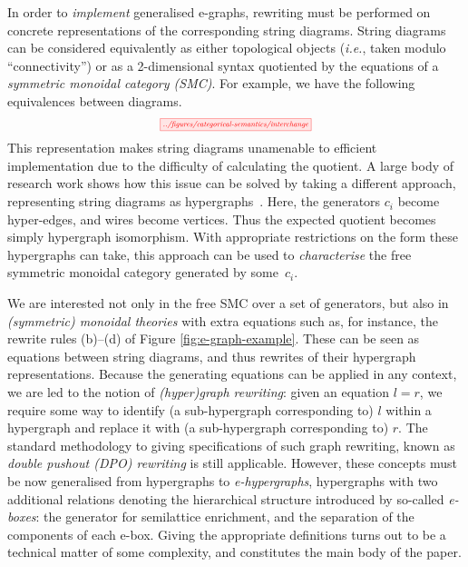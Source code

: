 In order to \textit{implement} generalised e-graphs, rewriting must be performed on concrete representations of the corresponding string diagrams.  String diagrams can be considered equivalently as either topological objects (\textit{i.e.}, taken modulo ``connectivity'') or as a 2-dimensional syntax quotiented by the equations of a \textit{symmetric monoidal category (SMC)}. 
For example, we have the following equivalences between diagrams. 
\[
	\scalebox{0.6}{
	\tikzfig{../figures/categorical-semantics/interchange}
	}
\]
This representation makes string diagrams unamenable to efficient implementation due to the difficulty of calculating the quotient. 
A large body of research work shows how this issue can be solved by taking a different approach, representing string diagrams as hypergraphs~\cite{bonchi_string_2022-1,bonchi_string_2022-2,bonchi_string_2022}.  Here, the generators $c_i$ become hyper-edges,  and wires become vertices.  Thus the expected quotient becomes simply hypergraph isomorphism. With appropriate restrictions on the form these hypergraphs can take, this approach can be used to \textit{characterise} the free symmetric monoidal category generated by some~$c_i$. 

We are interested not only in the free SMC over a set of generators, but also in \textit{(symmetric) monoidal theories} with extra equations such as, for instance, the rewrite rules (b)--(d) of Figure \ref{fig:e-graph-example}. These can be seen as equations between string diagrams, and thus rewrites of their hypergraph representations.  Because the generating equations can be applied in any context, we are led to the notion of \textit{(hyper)graph rewriting}: given an equation $l=r$, we require some way to identify (a sub-hypergraph corresponding to) $l$ within a hypergraph and replace it with (a sub-hypergraph corresponding to) $r$.
The standard methodology to giving specifications of such graph rewriting, known as \textit{double pushout (DPO) rewriting} \cite{dpo, bonchi_string_2022} is still applicable.
However, these concepts must be now generalised from hypergraphs to \textit{e-hypergraphs}, hypergraphs with two additional relations denoting the hierarchical structure introduced by so-called \textit{e-boxes}: the generator for semilattice enrichment, and the separation of the components of each e-box.
Giving the appropriate definitions turns out to be a technical matter of some complexity, and constitutes the main body of the paper. 

